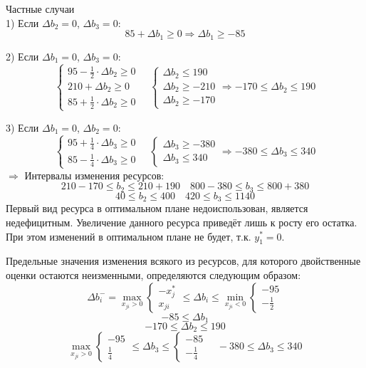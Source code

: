 \documentclass[17pt]{extarticle}
\begin{document}
Частные случаи \\
1) Если \( \Delta b_2 = 0 \), \( \Delta b_3 = 0 \):
\[
    85 + \Delta b_1 \geq 0 \Rightarrow \Delta b_1 \geq -85
\]

2) Если \( \Delta b_1 = 0 \), \( \Delta b_3 = 0 \):
\[
    \begin{cases}
        95 - \frac{1}{2} \cdot \Delta b_2 \geq 0 \\
        210 + \Delta b_2 \geq 0                  \\
        85 + \frac{1}{2} \cdot \Delta b_2 \geq 0
    \end{cases}
    \quad \begin{cases}
        \Delta b_2 \leq 190  \\
        \Delta b_2 \geq -210 \\
        \Delta b_2 \geq -170
    \end{cases}
    \Rightarrow -170 \leq \Delta b_2 \leq 190
\]

3) Если \( \Delta b_1 = 0 \), \( \Delta b_2 = 0 \):
\[
    \begin{cases}
        95 + \frac{1}{4} \cdot \Delta b_3 \geq 0 \\
        85 - \frac{1}{4} \cdot \Delta b_3 \geq 0
    \end{cases}
    \quad \begin{cases}
        \Delta b_3 \geq -380 \\
        \Delta b_3 \leq 340
    \end{cases}
    \Rightarrow -380 \leq \Delta b_3 \leq 340
\]
$\Rightarrow$ Интервалы изменения ресурсов:
\[
    210 - 170 \leq b_2 \leq 210 + 190 \quad 800 - 380 \leq b_3 \leq 800 + 380
\]
\[
    40 \leq b_2 \leq 400 \quad 420 \leq b_3 \leq 1140
\]
Первый вид ресурса в оптимальном плане недоиспользован, является недефицитным.
Увеличение данного ресурса приведёт лишь к росту его остатка. При этом изменений в оптимальном плане не будет, т.к. \( y_1^* = 0 \).

Предельные значения изменения всякого из ресурсов, для которого двойственные оценки остаются неизменными, определяются следующим образом:
\[
    \Delta b_i^- = \max_{x_{ji} > 0}
    \begin{cases}
        -x_j^* \\
        x_{ji}
    \end{cases}
    \le \Delta b_i \le \min_{x_{ji} < 0}
    \begin{cases}
        -95 \\
        -\frac{1}{2}
    \end{cases}
\]
\[
    -85 \le \Delta b_1
\]
\[
    -170 \le \Delta b_2 \le 190
\]
\[
    \max_{x_{ji} > 0}
    \begin{cases}
        -95 \\
        \frac{1}{4}
    \end{cases}
    \le \Delta b_3 \le
    \begin{cases}
        -85 \\
        -\frac{1}{4}
    \end{cases}
    \quad -380 \le \Delta b_3 \le 340
\]
\end{document}
